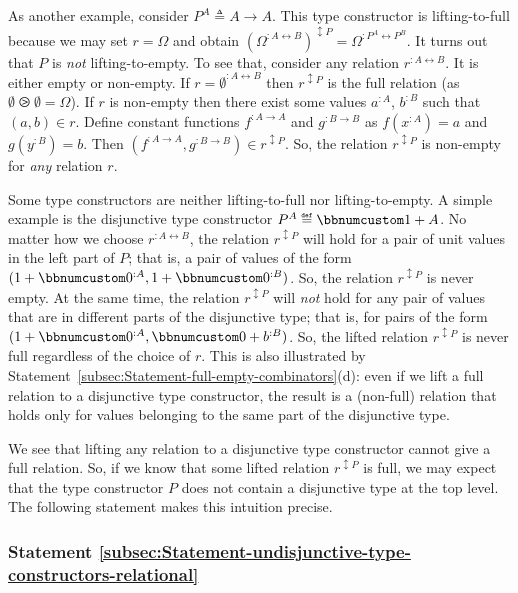 As another example, consider $P^{A}\triangleq A\rightarrow A$. This
type constructor is lifting-to-full because we may set $r=\Omega$
and obtain $(\Omega^{:A\leftrightarrow B})^{\updownarrow P}=\Omega^{:P^{A}\leftrightarrow P^{B}}$.
It turns out that $P$ is \emph{not} lifting-to-empty. To see that,
consider any relation $r^{:A\leftrightarrow B}$. It is either empty
or non-empty. If $r=\emptyset^{:A\leftrightarrow B}$ then $r^{\updownarrow P}$
is the full relation (as $\emptyset\ogreaterthan\emptyset=\Omega$).
If $r$ is non-empty then there exist some values $a^{:A}$, $b^{:B}$
such that $(a,b)\in r$. Define constant functions $f^{:A\rightarrow A}$
and $g^{:B\rightarrow B}$ as $f(x^{:A})=a$ and $g(y^{:B})=b$. Then
$(f^{:A\rightarrow A},g^{:B\rightarrow B})\in r^{\updownarrow P}$.
So, the relation $r^{\updownarrow P}$ is non-empty for \emph{any}
relation $r$.

Some type constructors are neither lifting-to-full nor lifting-to-empty.
A simple example is the disjunctive type constructor $P^{A}\triangleq\bbnum 1+A$.
No matter how we choose $r^{:A\leftrightarrow B}$, the relation $r^{\updownarrow P}$
will hold for a pair of unit values in the left part of $P$; that
is, a pair of values of the form $(1+\bbnum 0^{:A},1+\bbnum 0^{:B})$.
So, the relation $r^{\updownarrow P}$ is never empty. At the same
time, the relation $r^{\updownarrow P}$ will \emph{not} hold for
any pair of values that are in different parts of the disjunctive
type; that is, for pairs of the form $(1+\bbnum 0^{:A},\bbnum 0+b^{:B})$.
So, the lifted relation $r^{\updownarrow P}$ is never full regardless
of the choice of $r$. This is also illustrated by Statement~\ref{subsec:Statement-full-empty-combinators}(d):
even if we lift a full relation to a disjunctive type constructor,
the result is a (non-full) relation that holds only for values belonging
to the same part of the disjunctive type.

We see that lifting any relation to a disjunctive type constructor
cannot give a full relation. So, if we know that some lifted relation
$r^{\updownarrow P}$ is full, we may expect that the type constructor
$P$ does not contain a disjunctive type at the top level. The following
statement makes this intuition precise.

\subsubsection{Statement \label{subsec:Statement-undisjunctive-type-constructors-relational}\ref{subsec:Statement-undisjunctive-type-constructors-relational}}

